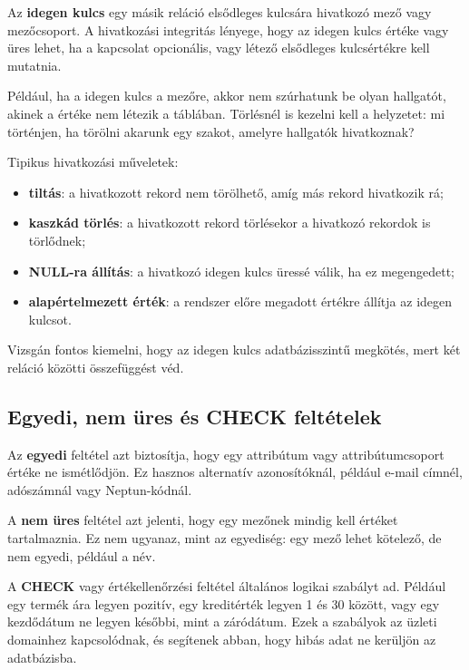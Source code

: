 Az \textbf{idegen kulcs} egy másik reláció elsődleges kulcsára hivatkozó mező vagy mezőcsoport. A hivatkozási integritás lényege, hogy az idegen kulcs értéke vagy üres lehet, ha a kapcsolat opcionális, vagy létező elsődleges kulcsértékre kell mutatnia.

Például, ha a  idegen kulcs a  mezőre, akkor nem szúrhatunk be olyan hallgatót, akinek a  értéke nem létezik a  táblában. Törlésnél is kezelni kell a helyzetet: mi történjen, ha törölni akarunk egy szakot, amelyre hallgatók hivatkoznak?

Tipikus hivatkozási műveletek:

\begin{itemize}
  \item \textbf{tiltás}: a hivatkozott rekord nem törölhető, amíg más rekord hivatkozik rá;
  \item \textbf{kaszkád törlés}: a hivatkozott rekord törlésekor a hivatkozó rekordok is törlődnek;
  \item \textbf{NULL-ra állítás}: a hivatkozó idegen kulcs üressé válik, ha ez megengedett;
  \item \textbf{alapértelmezett érték}: a rendszer előre megadott értékre állítja az idegen kulcsot.
\end{itemize}

Vizsgán fontos kiemelni, hogy az idegen kulcs adatbázisszintű megkötés, mert két reláció közötti összefüggést véd.

\subsection{Egyedi, nem üres és CHECK feltételek}

Az \textbf{egyedi} feltétel azt biztosítja, hogy egy attribútum vagy attribútumcsoport értéke ne ismétlődjön. Ez hasznos alternatív azonosítóknál, például e-mail címnél, adószámnál vagy Neptun-kódnál.

A \textbf{nem üres} feltétel azt jelenti, hogy egy mezőnek mindig kell értéket tartalmaznia. Ez nem ugyanaz, mint az egyediség: egy mező lehet kötelező, de nem egyedi, például a név.

A \textbf{CHECK} vagy értékellenőrzési feltétel általános logikai szabályt ad. Például egy termék ára legyen pozitív, egy kreditérték legyen 1 és 30 között, vagy egy kezdődátum ne legyen későbbi, mint a záródátum. Ezek a szabályok az üzleti domainhez kapcsolódnak, és segítenek abban, hogy hibás adat ne kerüljön az adatbázisba.

